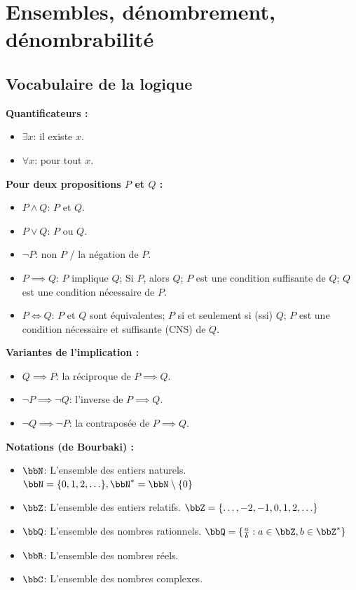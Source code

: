 \chapter{Ensembles, dénombrement, dénombrabilité}

\section{Vocabulaire de la logique}

\textbf{Quantificateurs :}
\begin{itemize}
    \item $\exists x$: il existe $x$.
    \item $\forall x$: pour tout $x$.
\end{itemize}

\textbf{Pour deux propositions $P$ et $Q$ :}
\begin{itemize}
    \item $P \land Q$: $P$ et $Q$.
    \item $P \lor Q$: $P$ ou $Q$.
    \item $\neg P$: non $P$ / la négation de $P$.
    \item $P \implies Q$: $P$ implique $Q$;
          Si $P$, alors $Q$;
          $P$ est une condition suffisante de $Q$;
          $Q$ est une condition nécessaire de $P$.
    \item $P \iff Q$: $P$ et $Q$ sont équivalentes;
          $P$ si et seulement si (ssi) $Q$;
          $P$ est une condition nécessaire et suffisante (CNS) de $Q$.
\end{itemize}

\textbf{Variantes de l'implication :}
\begin{itemize}
    \item $Q \implies P$: la réciproque de $P \implies Q$.
    \item $\neg P \implies \neg Q$: l'inverse de $P \implies Q$.
    \item $\neg Q \implies \neg P$: la contraposée de $P \implies Q$.
\end{itemize}

\textbf{Notations (de Bourbaki) :}
\begin{itemize}
    \item $\bbN$: L'ensemble des entiers naturels.
          $\bbN = \{ 0, 1, 2, \ldots \}, \bbN^* = \bbN \setminus \{ 0 \}$
    \item $\bbZ$: L'ensemble des entiers relatifs.
          $\bbZ = \{ \ldots, -2, -1, 0, 1, 2, \ldots \}$
    \item $\bbQ$: L'ensemble des nombres rationnels.
          $\bbQ = \{ \frac{a}{b} : a \in \bbZ, b \in \bbZ^* \}$
    \item $\bbR$: L'ensemble des nombres réels.
    \item $\bbC$: L'ensemble des nombres complexes.
\end{itemize}

